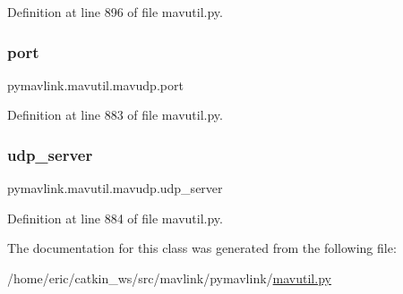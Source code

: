 Definition at line 896 of file mavutil.\+py.

\mbox{\label{classpymavlink_1_1mavutil_1_1mavudp_a0ea30c1f7c58ff3c409e50ed8a4b5054}} 
\subsubsection{\texorpdfstring{port}{port}}
{\footnotesize\ttfamily pymavlink.\+mavutil.\+mavudp.\+port}



Definition at line 883 of file mavutil.\+py.

\mbox{\label{classpymavlink_1_1mavutil_1_1mavudp_a954bbb6e696f876daa2b2b5ef14618ce}} 
\subsubsection{\texorpdfstring{udp\_server}{udp\_server}}
{\footnotesize\ttfamily pymavlink.\+mavutil.\+mavudp.\+udp\+\_\+server}



Definition at line 884 of file mavutil.\+py.



The documentation for this class was generated from the following file\+:\begin{DoxyCompactItemize}
\item 
/home/eric/catkin\+\_\+ws/src/mavlink/pymavlink/\mbox{\hyperlink{mavutil_8py}{mavutil.\+py}}\end{DoxyCompactItemize}
